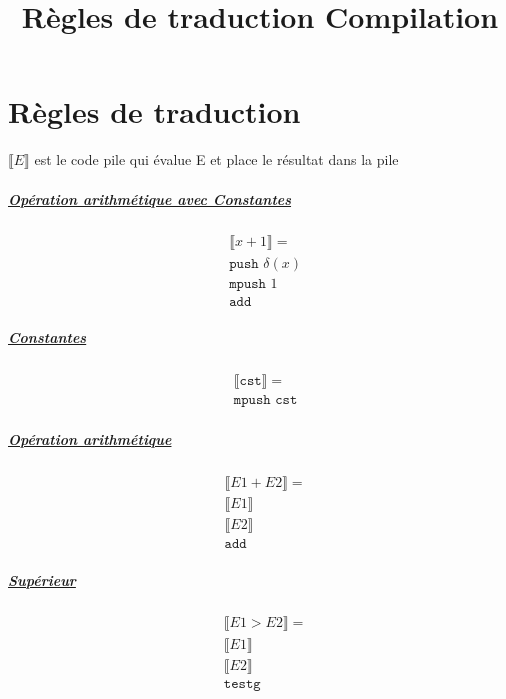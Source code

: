 \documentclass[12pt,twocolumn]{report}
\title{Règles de traduction Compilation}
\date{}
\begin{document}
\chapter*{Règles de traduction}

$\llbracket E \rrbracket$ est le code pile qui évalue E et place le résultat dans la pile

\begin{trad}
\paragraph*{ \underline{Opération arithmétique avec Constantes}}
\begin{align*}
    &\llbracket x +1 \rrbracket = \\
    &\texttt{push } \delta(x)\\
    &\texttt{mpush } 1\\
    &\texttt{add}
\end{align*}
\end{trad}
\begin{trad}
    \paragraph*{ \underline{Constantes}}
    \begin{align*}
        &\llbracket \texttt{cst} \rrbracket = \\
        &\texttt{mpush cst}
    \end{align*}
\end{trad}
\begin{trad}
    \paragraph*{ \underline{Opération arithmétique}}
    \begin{align*}
        &\llbracket E1+E2 \rrbracket = \\
        &\llbracket E1 \rrbracket\\
        &\llbracket E2 \rrbracket\\
        &\texttt{add}
    \end{align*}
\end{trad}
\begin{trad}
    \paragraph*{ \underline{Supérieur}}
    \begin{align*}
        &\llbracket E1>E2 \rrbracket = \\
        &\llbracket E1 \rrbracket\\
        &\llbracket E2 \rrbracket\\
        &\texttt{testg}
    \end{align*}
\end{trad}
\end{document}
